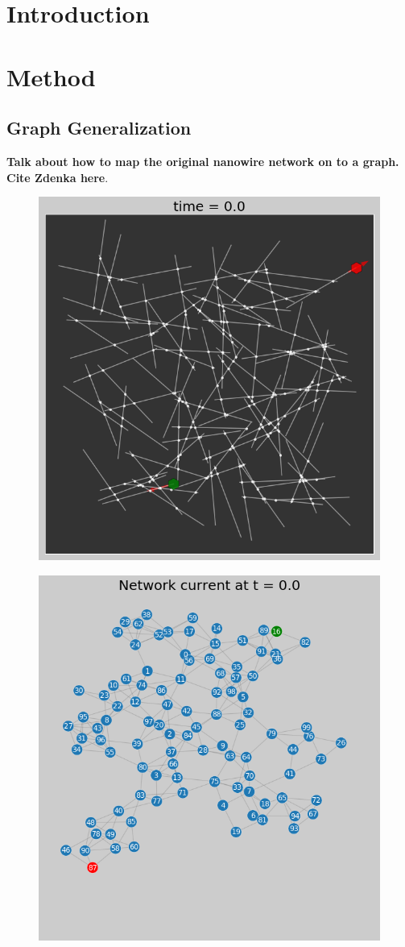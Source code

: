 \documentclass[%
 reprint,
 amsmath,amssymb,
 aps,
]{revtex4-2}
\begin{document}

\section{\label{sec:level1}  Introduction}
\section{\label{sec:level1} Method}

\subsection{Graph Generalization}

\textbf{Talk about how to map the original nanowire network on to a graph. Cite Zdenka here}.

\begin{figure}[h]
	\centering
	\includegraphics[width=0.7\linewidth]{figure/mpl_plot}
	\caption{}
	\label{fig:mpl_plot}
\end{figure}

\begin{figure}[h]
	\centering
	\includegraphics[width=0.8\linewidth]{figure/graph_plot}
	\caption{}
	\label{fig:graph_plot}
\end{figure}
\end{document}
